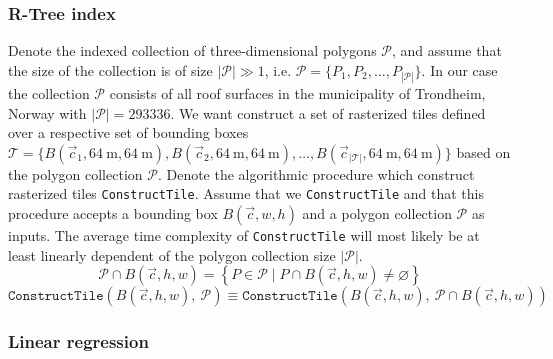 \subsubsection{R-Tree index}

Denote the indexed collection of three-dimensional polygons $\mathcal{P}$, and assume that the size of the collection is of size $|\mathcal{P}| \gg 1$, i.e. $\mathcal{P} = \{P_1, P_2, \dots, P_{|\mathcal{P}|} \}$.
In our case the collection $\mathcal{P}$ consists of all roof surfaces in the municipality of Trondheim, Norway with $|\mathcal{P}| = \num{293336}$.
We want construct a set of rasterized tiles defined over a respective set of bounding boxes $\mathcal{T} = \{B(\vec{c}_1, \SI{64}{\meter}, \SI{64}{\meter}), B(\vec{c}_2, \SI{64}{\meter}, \SI{64}{\meter}),\allowbreak \dots,\allowbreak B(\vec{c}_{|\mathcal{T}|}, \SI{64}{\meter}, \SI{64}{\meter}) \}$ based on the polygon collection $\mathcal{P}$.
Denote the algorithmic procedure which construct rasterized tiles \texttt{ConstructTile}.
Assume that we \texttt{ConstructTile} and that this procedure accepts a bounding box $B(\vec{c}, w, h)$ and a polygon collection $\mathcal{P}$ as inputs.
The average time complexity of \texttt{ConstructTile} will most likely be at least linearly dependent of the polygon collection size $|\mathcal{P}|$.
%
\begin{equation*}
  \mathcal{P} \cap B(\vec{c}, h, w)
  =
  \left\{
    P \in \mathcal{P} \mid P \cap B(\vec{c}, h, w) \neq \varnothing
  \right\}
\end{equation*}
%
\begin{equation*}
  \texttt{ConstructTile}(B(\vec{c}, h, w),~\mathcal{P})
  \equiv
  \texttt{ConstructTile}(B(\vec{c}, h, w),~\mathcal{P} \cap B(\vec{c}, h, w))
\end{equation*}

\subsubsection{Linear regression}

